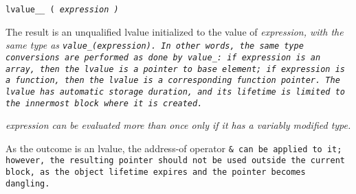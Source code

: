 
\tt{lvalue__ (} \it{expression} \tt{)}


The result is an unqualified lvalue initialized to the value of \it{expression},
with the same type as \tt{value_(}\it{expression}\tt{)}.
In other words, the same type conversions are performed as done by \tt{value_}:
if \it{expression} is an array, then the lvalue is a pointer to base element;
if \it{expression} is a function,
then the lvalue is a corresponding function pointer.
The lvalue has automatic storage duration,
and its lifetime is limited to the innermost block where it is created.

\it{expression} can be evaluated more than
once only if it has a variably modified type.

\note As the outcome is an lvalue, the address-of operator \tt{&} can be
applied to it; however, the resulting pointer should not be used outside the
current block, as the object lifetime expires and the pointer becomes dangling.
